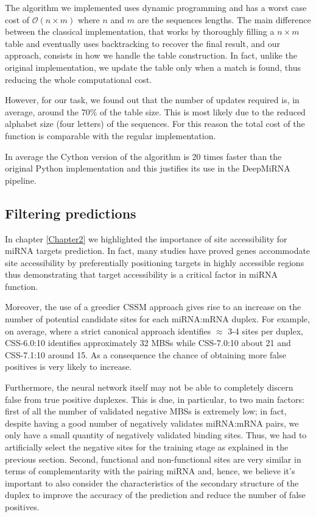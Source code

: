 The algorithm we implemented uses dynamic programming and has a worst case cost of $\mathcal{O}(n \times m)$ where $n$ and $m$ are the sequences lengths. The main difference between the classical implementation, that works by thoroughly filling a $n \times m$ table and eventually uses  backtracking to recover the final result, and our approach, consists in how we handle the table construction. In fact, unlike the original implementation, we update the table only when a match is found, thus reducing the whole computational cost. 

However, for our task, we found out that the number of updates required is, in average, around the 70\% of the table size. This is most likely due to the reduced alphabet size (four letters) of the sequences. For this reason the total cost of the function is comparable with the regular implementation.

In average the Cython version of the algorithm is 20 times faster than the original Python implementation and this justifies its use in the DeepMiRNA pipeline.

      

\subsection{Filtering predictions}
In chapter \ref{Chapter2} we highlighted the importance of site accessibility for miRNA targets prediction. In fact, many studies \cite{helwak} \cite{common_features} have proved genes accommodate site accessibility by preferentially positioning targets in highly accessible regions \cite{accessibility_nrg_role} thus demonstrating that target accessibility is a critical factor in miRNA function.

Moreover, the use of a greedier CSSM approach gives rise to an increase on the number of potential candidate sites for each miRNA:mRNA duplex. For example, on average, where a strict canonical approach identifies $\approx$ 3-4 sites per duplex, CSS-6.0:10 identifies approximately 32 MBSs while CSS-7.0:10 about 21 and CSS-7.1:10 around 15. As a consequence the chance of obtaining more false positives is very likely to increase.  

Furthermore, the neural network itself may not be able to completely discern false from true positive duplexes. This is due, in particular, to two main factors: first of all the number of validated negative MBSs is extremely low; in fact, despite having  a good number of negatively validates miRNA:mRNA pairs, we only have a small quantity of negatively validated binding sites. Thus, we had to artificially select the negative sites for the training stage as explained in the previous section. Second, functional and non-functional sites are very similar in terms of complementarity with the pairing miRNA and, hence, we believe it's important to also consider the characteristics of the secondary structure of the duplex to improve the accuracy of the prediction and reduce the number of false positives.

